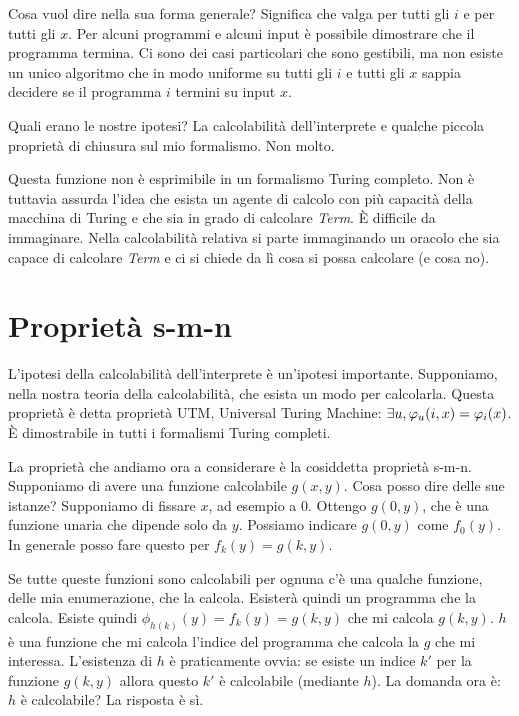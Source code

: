 Cosa vuol dire nella sua forma generale? Significa che valga per tutti gli $i$ e per tutti gli $x$.
Per alcuni programmi e alcuni input è possibile dimostrare che il programma termina. Ci sono dei
casi particolari che sono gestibili, ma non esiste un unico algoritmo che in modo uniforme su tutti
gli $i$ e tutti gli $x$ sappia decidere se il programma $i$ termini su input $x$.

Quali erano le nostre ipotesi? La calcolabilità dell'interprete e qualche piccola proprietà di
chiusura sul mio formalismo. Non molto.

Questa funzione non è esprimibile in un formalismo Turing completo. Non è tuttavia assurda l'idea
che esista un agente di calcolo con più capacità della macchina di Turing e che sia in grado di
calcolare \textit{Term}. È difficile da immaginare. Nella calcolabilità relativa si parte
immaginando un oracolo che sia capace di calcolare \textit{Term} e ci si chiede da lì cosa si possa
calcolare (e cosa no).

\section{Proprietà s-m-n}


L'ipotesi della calcolabilità dell'interprete è un'ipotesi importante. Supponiamo, nella nostra
teoria della calcolabilità, che esista un modo per calcolarla. Questa proprietà è detta proprietà
UTM, Universal Turing Machine: $\exists u, \varphi_{u}(i,x) = \varphi_{i}(x)$. È dimostrabile in tutti i
formalismi Turing completi.

La proprietà che andiamo ora a considerare è la cosiddetta proprietà s-m-n. Supponiamo di avere
una funzione calcolabile $g(x,y)$. Cosa posso dire delle sue istanze? Supponiamo di fissare $x$, ad
esempio a 0. Ottengo $g(0,y)$, che è una funzione unaria che dipende solo da $y$. Possiamo indicare
$g(0,y)$ come $f_{0}(y)$. In generale posso fare questo per $f_{k}(y) = g(k,y)$.

Se tutte queste funzioni sono calcolabili per ognuna c'è una qualche funzione, delle mia
enumerazione, che la calcola. Esisterà quindi un programma che la calcola. Esiste quindi
$\phi_{h(k)}(y) = f_{k}(y) = g(k,y)$ che mi calcola $g(k,y)$. $h$ è una funzione che mi calcola
l'indice del programma che calcola la $g$ che mi interessa. L'esistenza di $h$ è praticamente ovvia:
se esiste un indice $k'$ per la funzione $g(k,y)$ allora questo $k'$ è calcolabile (mediante $h$).
La domanda ora è: $h$ è calcolabile? La risposta è sì.

